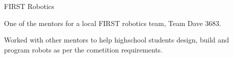 \begin{cventries}
  \cvprojectentry
    {FIRST Robotics} %
    {
      \begin{cvitems} %
        \item {One of the mentors for a local FIRST robotics team, Team Dave 3683.}
        \item {Worked with other mentors to help highschool students design, build and program robots as per the cometition requirements.}
      \end{cvitems}
    }

\end{cventries}
